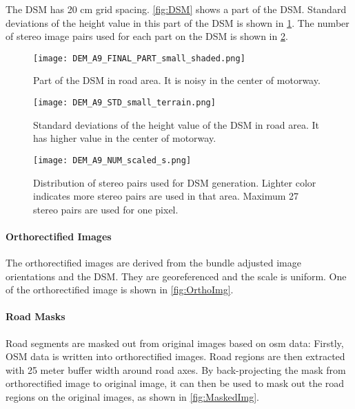The DSM has 20 cm grid spacing. \cref{fig:DSM} shows a part of the DSM. Standard deviations of the height value in this part of the DSM is shown in \cref{fig:DSMstd}. The number of stereo image pairs used for each part on the DSM is shown in \cref{fig:DSMnumber}.
\begin{figure}%
  \centering
  \texttt{[image: DEM\_A9\_FINAL\_PART\_small\_shaded.png]}
  \caption{Part of the DSM in road area. It is noisy in the center of motorway.}
  \label{fig:DSM}
\vspace{1cm}
  \centering
  \texttt{[image: DEM\_A9\_STD\_small\_terrain.png]}
  \caption{Standard deviations of the height value of the DSM in road area. It has higher value in the center of motorway.}
  \label{fig:DSMstd}
\end{figure}

\begin{figure}%
  \centering
  \texttt{[image: DEM\_A9\_NUM\_scaled\_s.png]}
  \caption{Distribution of stereo pairs used for DSM generation. Lighter color indicates more stereo pairs are used in that area. Maximum 27 stereo pairs are used for one pixel.}%
  \label{fig:DSMnumber}
\end{figure}


\paragraph{Orthorectified Images}
The orthorectified images are derived from the bundle adjusted image orientations and the DSM. They are georeferenced and the scale is uniform. One of the orthorectified image is shown in \cref{fig:OrthoImg}.

\paragraph{Road Masks}
Road segments are masked out from original images based on \gls{osm} data: Firstly, OSM data is written into orthorectified images. Road regions are then extracted with 25 meter buffer width around road axes. By back-projecting the mask from orthorectified image to original image, it can then be used to mask out the road regions on the original images, as shown in \cref{fig:MaskedImg}.

